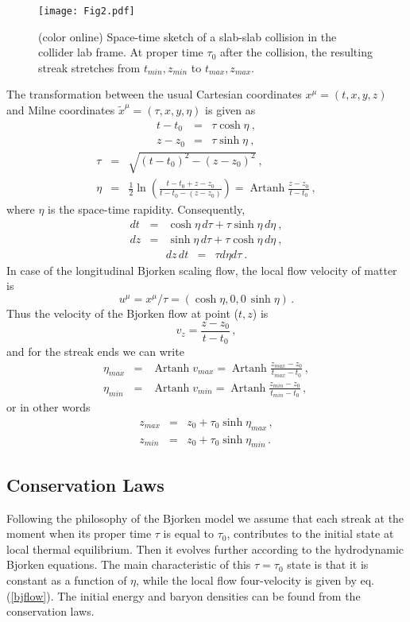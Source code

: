 \documentclass[aps,prc,twocolumn,floatfix,showpacs,a4paper,
nofootinbib,amsmath,amssymb]{revtex4-1}
\newcommand{\be}{\begin{equation}}
\newcommand{\ee}{\end{equation}}
\newcommand{\ba}{\begin{eqnarray}}
\newcommand{\ea}{\end{eqnarray}}
\DeclareMathOperator{\Artanh}{Artanh}
\begin{document}
%
\begin{figure}[ht]     %
\begin{center}
\resizebox{0.9\columnwidth}{!}
{\texttt{[image: Fig2.pdf]}}
\caption{ (color online)
Space-time sketch of a slab-slab collision in the collider lab frame.  At proper time $\tau_0$ after the collision, the resulting streak stretches from $t_{min}, z_{min}$  to $t_{max}, z_{max}$.
}
\label{f1}
\end{center}
\end{figure}        %
%
The transformation between the usual Cartesian coordinates $x^\mu =(t,x,y,z)$ and Milne coordinates
$\tilde{x}^\mu =(\tau,x,y,\eta)$  is given as
\ba
t - t_0 &=& \tau \cosh \eta  \ ,
\nonumber \\
z - z_0 &=& \tau \sinh \eta \ ,
\label{tz1}
\ea
\ba
\tau &=& \sqrt{(t-t_0)^2 - (z-z_0)^2} \ ,
\nonumber \\
\eta &=& \frac{1}{2} \ln\left(\frac{t-t_0 + z-z_0}{t-t_0 - (z-z_0)}\right) = \Artanh \frac{z-z_0}{t-t_0} \  ,
\label{taueta1}
\ea
where $\eta$ is the space-time rapidity. 
Consequently,
\ba
dt &=& \cosh \eta\, d\tau + \tau \sinh \eta\, d\eta \ ,
\nonumber \\
dz &=& \sinh \eta\, d\tau + \tau \cosh \eta\, d\eta \ ,
\label{dtdz1}
\ea
\ba
dz\, dt &=& \tau d\eta d\tau\ .
\label{dtdz2}
\ea
In case of the longitudinal Bjorken scaling flow, 
the local flow velocity of matter is 
\be
u^\mu ={x^\mu}/{\tau}= (\cosh \eta, 0,0\, \sinh \eta)\,.
\label{bjflow}
\ee
%
Thus the velocity of the Bjorken flow at point ($t,z$) is
\be
v_z = \frac{z-z_0}{t-t_0} \,,   
\ee
and for the streak ends we can write
\ba
\eta_{max}  & = & \Artanh v_{max} = \Artanh \frac{z_{max}-z_0}{t_{max}-t_0}\,, \nonumber \\
\eta_{min}  & = & \Artanh v_{min} = \Artanh \frac{z_{min}-z_0}{t_{min}-t_0} \,,
\label{etaMM}
\ea
or in other words 
\ba
z_{max} & = & z_0 + \tau_0 \sinh \eta_{max}\,, \nonumber \\
z_{min} & = & z_0 + \tau_0 \sinh \eta_{min}  \,.
\label{zMM}
\ea




\subsection{Conservation Laws}

Following the philosophy of the Bjorken model we assume that each streak at the moment when its proper time $\tau$ is equal to $\tau_0$,  contributes to the initial state at local thermal equilibrium. Then it evolves 
further according to the hydrodynamic Bjorken equations. The main 
characteristic of this $\tau=\tau_0$ state is that it is constant as a function of $\eta$, while the local flow four-velocity is given by eq. (\ref{bjflow}).
The initial energy and baryon densities can be found from the conservation laws.   
\end{document}
